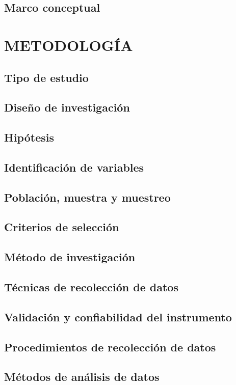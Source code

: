\documentclass{report}
\begin{document}
\subsection{Marco conceptual}

\section{METODOLOGÍA}
\subsection{Tipo de estudio}
\subsection{Diseño de investigación}
\subsection{Hipótesis}
\subsection{Identificación de variables}
\subsection{Población, muestra y muestreo}
\subsection{Criterios de selección}
\subsection{Método de investigación}
\subsection{Técnicas de recolección de datos}
\subsection{Validación y confiabilidad del instrumento}
\subsection{Procedimientos de recolección de datos}
\subsection{Métodos de análisis de datos}
\end{document}
